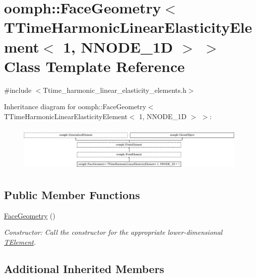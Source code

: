 \hypertarget{classoomph_1_1FaceGeometry_3_01TTimeHarmonicLinearElasticityElement_3_011_00_01NNODE__1D_01_4_01_4}{}\section{oomph\+:\+:Face\+Geometry$<$ T\+Time\+Harmonic\+Linear\+Elasticity\+Element$<$ 1, N\+N\+O\+D\+E\+\_\+1D $>$ $>$ Class Template Reference}
\label{classoomph_1_1FaceGeometry_3_01TTimeHarmonicLinearElasticityElement_3_011_00_01NNODE__1D_01_4_01_4}


{\ttfamily \#include $<$Ttime\+\_\+harmonic\+\_\+linear\+\_\+elasticity\+\_\+elements.\+h$>$}

Inheritance diagram for oomph\+:\+:Face\+Geometry$<$ T\+Time\+Harmonic\+Linear\+Elasticity\+Element$<$ 1, N\+N\+O\+D\+E\+\_\+1D $>$ $>$\+:\begin{figure}[H]
\begin{center}
\leavevmode
\includegraphics[height=2.262626cm]{classoomph_1_1FaceGeometry_3_01TTimeHarmonicLinearElasticityElement_3_011_00_01NNODE__1D_01_4_01_4}
\end{center}
\end{figure}
\subsection*{Public Member Functions}
\begin{DoxyCompactItemize}
\item 
\hyperlink{classoomph_1_1FaceGeometry_3_01TTimeHarmonicLinearElasticityElement_3_011_00_01NNODE__1D_01_4_01_4_a3d91fb2e278052fa0009413edff47d9c}{Face\+Geometry} ()
\begin{DoxyCompactList}\small\item\em Constructor\+: Call the constructor for the appropriate lower-\/dimensional \hyperlink{classoomph_1_1TElement}{T\+Element}. \end{DoxyCompactList}\end{DoxyCompactItemize}
\subsection*{Additional Inherited Members}


